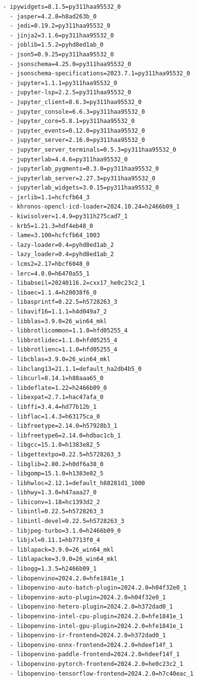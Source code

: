 \documentclass[11pt,a4paper]{article}
\begin{document}
\begin{lstlisting}[caption=Environment/Requirements file]
  - ipywidgets=8.1.5=py311haa95532_0
  - jasper=4.2.8=h8ad263b_0
  - jedi=0.19.2=py311haa95532_0
  - jinja2=3.1.6=py311haa95532_0
  - joblib=1.5.2=pyhd8ed1ab_0
  - json5=0.9.25=py311haa95532_0
  - jsonschema=4.25.0=py311haa95532_0
  - jsonschema-specifications=2023.7.1=py311haa95532_0
  - jupyter=1.1.1=py311haa95532_0
  - jupyter-lsp=2.2.5=py311haa95532_0
  - jupyter_client=8.6.3=py311haa95532_0
  - jupyter_console=6.6.3=py311haa95532_0
  - jupyter_core=5.8.1=py311haa95532_0
  - jupyter_events=0.12.0=py311haa95532_0
  - jupyter_server=2.16.0=py311haa95532_0
  - jupyter_server_terminals=0.5.3=py311haa95532_0
  - jupyterlab=4.4.6=py311haa95532_0
  - jupyterlab_pygments=0.3.0=py311haa95532_0
  - jupyterlab_server=2.27.3=py311haa95532_0
  - jupyterlab_widgets=3.0.15=py311haa95532_0
  - jxrlib=1.1=hcfcfb64_3
  - khronos-opencl-icd-loader=2024.10.24=h2466b09_1
  - kiwisolver=1.4.9=py311h275cad7_1
  - krb5=1.21.3=hdf4eb48_0
  - lame=3.100=hcfcfb64_1003
  - lazy-loader=0.4=pyhd8ed1ab_2
  - lazy_loader=0.4=pyhd8ed1ab_2
  - lcms2=2.17=hbcf6048_0
  - lerc=4.0.0=h6470a55_1
  - libabseil=20240116.2=cxx17_he0c23c2_1
  - libaec=1.1.4=h20038f6_0
  - libasprintf=0.22.5=h5728263_3
  - libavif16=1.1.1=h4d049a7_2
  - libblas=3.9.0=26_win64_mkl
  - libbrotlicommon=1.1.0=hfd05255_4
  - libbrotlidec=1.1.0=hfd05255_4
  - libbrotlienc=1.1.0=hfd05255_4
  - libcblas=3.9.0=26_win64_mkl
  - libclang13=21.1.1=default_ha2db4b5_0
  - libcurl=8.14.1=h88aaa65_0
  - libdeflate=1.22=h2466b09_0
  - libexpat=2.7.1=hac47afa_0
  - libffi=3.4.4=hd77b12b_1
  - libflac=1.4.3=h63175ca_0
  - libfreetype=2.14.0=h57928b3_1
  - libfreetype6=2.14.0=hdbac1cb_1
  - libgcc=15.1.0=h1383e82_5
  - libgettextpo=0.22.5=h5728263_3
  - libglib=2.80.2=h0df6a38_0
  - libgomp=15.1.0=h1383e82_5
  - libhwloc=2.12.1=default_h88281d1_1000
  - libhwy=1.3.0=h47aaa27_0
  - libiconv=1.18=hc1393d2_2
  - libintl=0.22.5=h5728263_3
  - libintl-devel=0.22.5=h5728263_3
  - libjpeg-turbo=3.1.0=h2466b09_0
  - libjxl=0.11.1=hb7713f0_4
  - liblapack=3.9.0=26_win64_mkl
  - liblapacke=3.9.0=26_win64_mkl
  - libogg=1.3.5=h2466b09_1
  - libopenvino=2024.2.0=hfe1841e_1
  - libopenvino-auto-batch-plugin=2024.2.0=h04f32e0_1
  - libopenvino-auto-plugin=2024.2.0=h04f32e0_1
  - libopenvino-hetero-plugin=2024.2.0=h372dad0_1
  - libopenvino-intel-cpu-plugin=2024.2.0=hfe1841e_1
  - libopenvino-intel-gpu-plugin=2024.2.0=hfe1841e_1
  - libopenvino-ir-frontend=2024.2.0=h372dad0_1
  - libopenvino-onnx-frontend=2024.2.0=hdeef14f_1
  - libopenvino-paddle-frontend=2024.2.0=hdeef14f_1
  - libopenvino-pytorch-frontend=2024.2.0=he0c23c2_1
  - libopenvino-tensorflow-frontend=2024.2.0=h7c40eac_1

\end{lstlisting}
\end{document}
